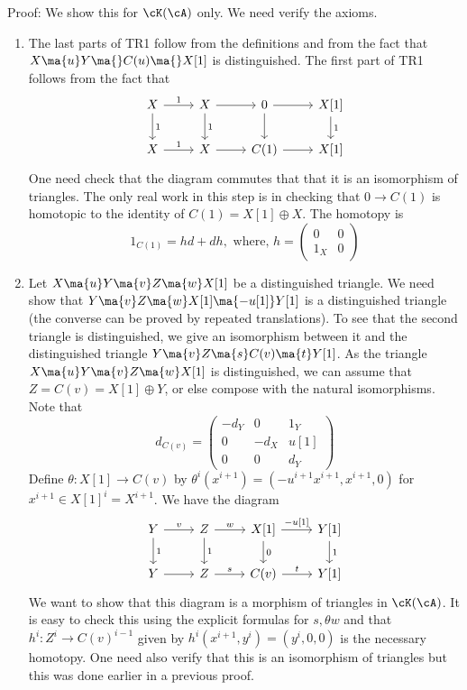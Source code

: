 Proof: We show this for $\cK(\cA)$ only. We need verify the axioms.
\begin{enumerate}[1]
\item The last parts of TR1 follow from the definitions and from the fact that $X \ma{u} Y \ma{} C(u) \ma{} X[1]$ is distinguished. The first part of TR1 follows from the fact that 
\[
\begin{tikzcd}
X \arrow{r}{1} \arrow{d}{1} & X \arrow{d}{1} \arrow{r} & 0 \arrow{r} \arrow{d} & X[1] \arrow{d}{1} \\
X \arrow{r}{1} & X \arrow{r} & C(1) \arrow{r} & X[1]
\end{tikzcd}
\]
One need check that the diagram commutes that that it is an isomorphism of triangles. The only real work in this step is in checking that $0 \to C(1)$ is homotopic to the identity of $C(1)=X[1] \oplus X$. The homotopy is
\[
1_{C(1)}= hd+dh, \text{ where, }h= \begin{pmatrix} 0 & 0 \\ 1_X & 0 \end{pmatrix}
\]
\item Let $X \ma{u} Y \ma{v} Z \ma{w} X[1]$ be a distinguished triangle. We need show that $Y \ma{v} Z \ma{w} X[1] \ma{-u[1]} Y[1]$ is a distinguished triangle (the converse can be proved by repeated translations). To see that the second triangle is distinguished, we give an isomorphism between it and the distinguished triangle $Y \ma{v} Z \ma{s} C(v) \ma{t} Y[1]$. As the triangle $X \ma{u} Y \ma{v} Z \ma{w} X[1]$ is distinguished, we can assume that $Z=C(v)=X[1] \oplus Y$, or else compose with the natural isomorphisms. Note that
\[
d_{C(v)}= \begin{pmatrix} -d_Y & 0 & 1_Y \\ 0 & -d_X & u[1] \\ 0 & 0 & d_Y \end{pmatrix}
\]
Define $\theta: X[1] \to C(v)$ by $\theta^i(x^{i+1})=(-u^{i+1}x^{i+1}, x^{i+1},0)$ for $x^{i+1} \in X[1]^i=X^{i+1}$. We have the diagram
\[
\begin{tikzcd}
Y \arrow{r}{v} \arrow{d}{1} & Z \arrow{d}{1} \arrow{r}{w} & X[1] \arrow{r}{-u[1]} \arrow{d}{0} & Y[1] \arrow{d}{1} \\
Y \arrow{r} & Z \arrow{r}{s} & C(v) \arrow{r}{t} & Y[1]
\end{tikzcd}
\]
We want to show that this diagram is a morphism of triangles in $\cK(\cA)$. It is easy to check this using the explicit formulas for $s,\theta w$ and that $h^i: Z^i \to C(v)^{i-1}$ given by $h^i(x^{i+1},y^i)=(y^i,0,0)$ is the necessary homotopy. One need also verify that this is an isomorphism of triangles but this was done earlier in a previous proof. 


\end{enumerate}
